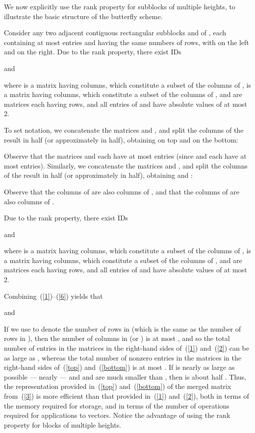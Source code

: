 \documentclass[final,3p,times]{elsarticle}
\begin{document}
We now explicitly use the rank property for subblocks of multiple heights,
to illustrate the basic structure of the butterfly scheme.

Consider any two adjacent contiguous rectangular subblocks  and  of ,
each containing at most  entries and having the same numbers of rows,
with  on the left and  on the right.
Due to the rank property, there exist IDs

and

where  is a matrix having  columns,
which constitute a subset of the columns of ,
 is a matrix having  columns,
which constitute a subset of the columns of ,
 and  are matrices each having  rows,
and all entries of  and  have absolute values
of at most 2.

To set notation, we concatenate the matrices  and ,
and split the columns of the result in half (or approximately in half),
obtaining  on top and  on the bottom:

Observe that the matrices  and  each have at most  entries
(since  and  each have at most  entries).
Similarly, we concatenate the matrices  and ,
and split the columns of the result in half (or approximately in half),
obtaining  and :

Observe that the  columns of  are also columns of ,
and that the  columns of  are also columns of .

Due to the rank property, there exist IDs

and

where  is a matrix having  columns,
which constitute a subset of the columns of ,
 is a matrix having  columns,
which constitute a subset of the columns of ,
 and  are matrices
each having  rows, and all entries of 
and  have absolute values of at most 2.

Combining~(\ref{1})--(\ref{6}) yields that

and


If we use  to denote the number of rows in  (which is the same
as the number of rows in ),
then the number of columns in  (or ) is at most ,
and so the total number of entries in the matrices
in the right-hand sides of~(\ref{1}) and~(\ref{2})
can be as large as ,
whereas the total number of nonzero entries in the matrices
in the right-hand sides of~(\ref{top}) and~(\ref{bottom})
is at most .
If  is nearly as large as possible --- nearly  ---
and  and  are much smaller than ,
then  is about half .
Thus, the representation provided in~(\ref{top}) and~(\ref{bottom})
of the merged matrix from~(\ref{3})
is more efficient than that provided in~(\ref{1}) and~(\ref{2}),
both in terms of the memory required for storage,
and in terms of the number of operations required for applications to vectors.
Notice the advantage of using the rank property for blocks of multiple heights.
\end{document}
